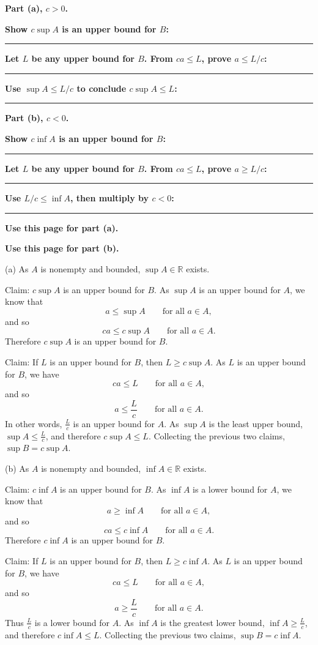 \documentclass[12pt]{article}
\newcommand{\R}{\mathbb{R}}
\newcommand{\writespace}[1]{\vspace*{#1}}
\newcommand{\workquestion}[2]{%
  \par\noindent\textbf{#1}\par
  \writespace{#2}
  \noindent\rule{\linewidth}{0.35pt}\par\vspace{0.18in}%
}
\newenvironment{skeletonbox}[1]{%
  \begin{tcolorbox}[
    enhanced,
    breakable,
    colback=pass4purple,
    colframe=purple!55!black,
    fonttitle=\bfseries,
    title={Pass 4 -- Skeleton Proof\hfill #1}
  ]
}{%
  \end{tcolorbox}
}
\newcommand{\fullproofpage}[2]{%
  \begin{tcolorbox}[
    enhanced,
    colback=white,
    colframe=gray!60!black,
    fonttitle=\bfseries,
    title={Pass 5 -- Full Proof Attempt\hfill #1},
    height=8.45in
  ]
  \textbf{#2}

  \writespace{7.65in}
  \end{tcolorbox}
}
\newenvironment{solutionbox}[1]{%
  \begin{tcolorbox}[
    enhanced,
    breakable,
    colback=solgreen,
    colframe=green!45!black,
    fonttitle=\bfseries,
    title={#1}
  ]
}{%
  \end{tcolorbox}
}
\begin{document}
\newpage
\begin{skeletonbox}{Homework 3, Problem 4}
\textbf{Part (a), \(c>0\).}
\workquestion{Show \(c\sup A\) is an upper bound for \(B\):}{0.9in}
\workquestion{Let \(L\) be any upper bound for \(B\). From \(ca\le L\), prove \(a\le L/c\):}{0.95in}
\workquestion{Use \(\sup A\le L/c\) to conclude \(c\sup A\le L\):}{0.85in}

\textbf{Part (b), \(c<0\).}
\workquestion{Show \(c\inf A\) is an upper bound for \(B\):}{0.9in}
\workquestion{Let \(L\) be any upper bound for \(B\). From \(ca\le L\), prove \(a\ge L/c\):}{0.95in}
\workquestion{Use \(L/c\le\inf A\), then multiply by \(c<0\):}{0.85in}
\end{skeletonbox}

\newpage
\fullproofpage{Homework 3, Problem 4}{Use this page for part (a).}

\newpage
\fullproofpage{Homework 3, Problem 4}{Use this page for part (b).}

\newpage
\begin{solutionbox}{Official Solution (Professor)}
(a) As \(A\) is nonempty and bounded, \(\sup A\in\R\) exists.

Claim: \(c\sup A\) is an upper bound for \(B\). As \(\sup A\) is an upper bound for \(A\), we know that
\[
  a\le\sup A \qquad \text{for all }a\in A,
\]
and so
\[
  ca\le c\sup A \qquad \text{for all }a\in A.
\]
Therefore \(c\sup A\) is an upper bound for \(B\).

Claim: If \(L\) is an upper bound for \(B\), then \(L\ge c\sup A\). As \(L\) is an upper bound for \(B\), we have
\[
  ca\le L \qquad \text{for all }a\in A,
\]
and so
\[
  a\le \frac Lc \qquad \text{for all }a\in A.
\]
In other words, \(\frac Lc\) is an upper bound for \(A\). As \(\sup A\) is the least upper bound, \(\sup A\le\frac Lc\), and therefore \(c\sup A\le L\). Collecting the previous two claims, \(\sup B=c\sup A\).

(b) As \(A\) is nonempty and bounded, \(\inf A\in\R\) exists.

Claim: \(c\inf A\) is an upper bound for \(B\). As \(\inf A\) is a lower bound for \(A\), we know that
\[
  a\ge\inf A \qquad \text{for all }a\in A,
\]
and so
\[
  ca\le c\inf A \qquad \text{for all }a\in A.
\]
Therefore \(c\inf A\) is an upper bound for \(B\).

Claim: If \(L\) is an upper bound for \(B\), then \(L\ge c\inf A\). As \(L\) is an upper bound for \(B\), we have
\[
  ca\le L \qquad \text{for all }a\in A,
\]
and so
\[
  a\ge \frac Lc \qquad \text{for all }a\in A.
\]
Thus \(\frac Lc\) is a lower bound for \(A\). As \(\inf A\) is the greatest lower bound, \(\inf A\ge\frac Lc\), and therefore \(c\inf A\le L\). Collecting the previous two claims, \(\sup B=c\inf A\).
\end{solutionbox}
\end{document}
